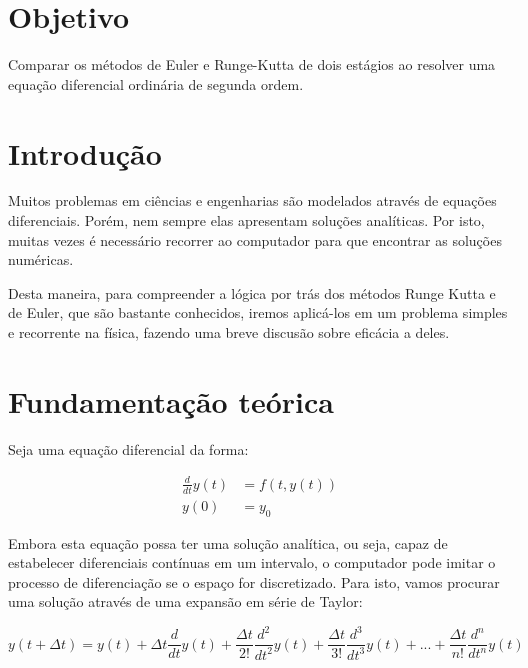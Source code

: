 \documentclass[
		12pt,            %
		a4paper
	      ]  
	      {article}          %
\begin{document}
	
		\section{Objetivo}
	
	Comparar os métodos de Euler e Runge-Kutta de dois estágios
	ao resolver uma equação diferencial ordinária de segunda ordem.




	\section{Introdução}

	Muitos problemas em ciências e engenharias são modelados através de equações 
	diferenciais. Porém, nem sempre elas apresentam soluções analíticas. Por isto, 
	muitas vezes é necessário recorrer ao computador para que encontrar as soluções 
	numéricas.\par

	Desta maneira, para compreender a lógica por trás dos métodos Runge Kutta e de Euler, 
	que são bastante conhecidos, iremos aplicá-los em um problema simples e recorrente 
	na física, fazendo uma breve discusão sobre eficácia a deles.

	\section{Fundamentação teórica}

	Seja uma equação diferencial da forma:
	
	\vspace{-5mm}
	\begin{equation}\label{eq:diff}
		\begin{aligned}
			\frac{d}{dt} y(t)&=f\left ( t,y(t) \right ) \\
			y(0) &= y_0
		\end{aligned}
	\end{equation}
	\vspace{-5mm}
	
	Embora esta equação possa ter uma solução analítica, ou seja, capaz de estabelecer 
	diferenciais contínuas em um intervalo, o computador pode imitar o processo de 
	diferenciação se o espaço for discretizado. Para isto, vamos procurar uma solução através 
	de uma expansão em série de Taylor:
	
	\vspace{-13mm}
	\begin{equation*}
		y(t+\Delta t) = y(t) + \Delta t \dfrac{d}{dt}y(t)
		+  \frac{\Delta t }{2!}\dfrac{d^2}{dt^2}y(t) + 
		\frac{ \Delta t }{3!}  \dfrac{d^3}{dt^3}y(t) +...+
		\frac{ \Delta t }{n!}  \dfrac{d^n}{dt^n}y(t) 
	\end{equation*}
	\vspace{-13mm}
\end{document}
